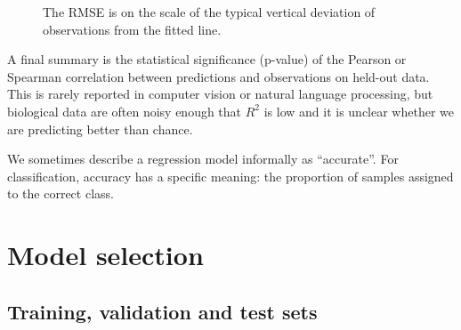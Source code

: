 \begin{figure}[t]
  \centering
  \caption{The RMSE is on the scale of the typical vertical deviation of observations from the fitted line.}
  \label{fig:rmse}
\end{figure}

A final summary is the statistical significance (p-value) of the Pearson or Spearman correlation between predictions and observations on held-out data. This is rarely reported in computer vision or natural language processing, but biological data are often noisy enough that $R^2$ is low and it is unclear whether we are predicting better than chance.

We sometimes describe a regression model informally as ``accurate''. For classification, accuracy has a specific meaning: the proportion of samples assigned to the correct class.

\section{Model selection}
\label{sec:model_selection}

\subsection{Training, validation and test sets}

